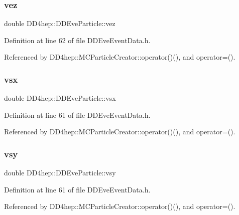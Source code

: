 \subsubsection{\texorpdfstring{vez}{vez}}
{\footnotesize\ttfamily double D\+D4hep\+::\+D\+D\+Eve\+Particle\+::vez}



Definition at line 62 of file D\+D\+Eve\+Event\+Data.\+h.



Referenced by D\+D4hep\+::\+M\+C\+Particle\+Creator\+::operator()(), and operator=().

\hypertarget{class_d_d4hep_1_1_d_d_eve_particle_a28dbdeb3997f9b8342ccd4c9e6991a92}{}\label{class_d_d4hep_1_1_d_d_eve_particle_a28dbdeb3997f9b8342ccd4c9e6991a92} 
\subsubsection{\texorpdfstring{vsx}{vsx}}
{\footnotesize\ttfamily double D\+D4hep\+::\+D\+D\+Eve\+Particle\+::vsx}



Definition at line 61 of file D\+D\+Eve\+Event\+Data.\+h.



Referenced by D\+D4hep\+::\+M\+C\+Particle\+Creator\+::operator()(), and operator=().

\hypertarget{class_d_d4hep_1_1_d_d_eve_particle_a44cd9286a2e84819c40fc89f426fe322}{}\label{class_d_d4hep_1_1_d_d_eve_particle_a44cd9286a2e84819c40fc89f426fe322} 
\subsubsection{\texorpdfstring{vsy}{vsy}}
{\footnotesize\ttfamily double D\+D4hep\+::\+D\+D\+Eve\+Particle\+::vsy}



Definition at line 61 of file D\+D\+Eve\+Event\+Data.\+h.



Referenced by D\+D4hep\+::\+M\+C\+Particle\+Creator\+::operator()(), and operator=().

\hypertarget{class_d_d4hep_1_1_d_d_eve_particle_a8b93479f6e6812a6902a8574fce930e9}{}\label{class_d_d4hep_1_1_d_d_eve_particle_a8b93479f6e6812a6902a8574fce930e9} 
